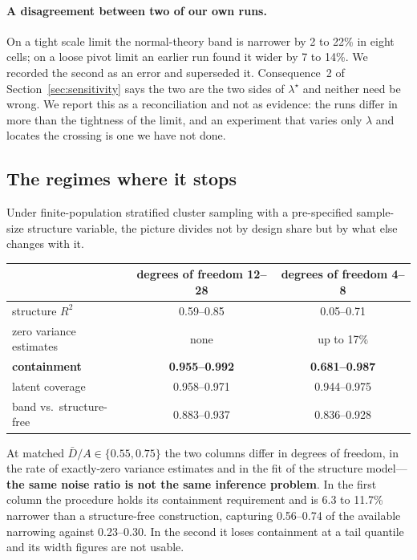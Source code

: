 \paragraph{A disagreement between two of our own runs.} On a tight scale limit
the normal-theory band is narrower by 2 to 22\% in eight cells; on a loose pivot
limit an earlier run found it wider by 7 to 14\%. We recorded the second as an
error and superseded it. Consequence~2 of Section~\ref{sec:sensitivity} says the
two are the two sides of $\lambda^\star$ and neither need be wrong. We report
this as a reconciliation and not as evidence: the runs differ in more than the
tightness of the limit, and an experiment that varies only $\lambda$ and locates
the crossing is one we have not done.

\subsection{The regimes where it stops}

Under finite-population stratified cluster sampling with a pre-specified
sample-size structure variable, the picture divides not by design share but by
what else changes with it.

\begin{center}
\begin{singlespace}
\small
\begin{tabular}{lcc}
\toprule
& degrees of freedom 12--28 & degrees of freedom 4--8\\
\midrule
structure $R^2$ & 0.59--0.85 & 0.05--0.71\\
zero variance estimates & none & up to 17\%\\
\textbf{containment} & \textbf{0.955--0.992} & \textbf{0.681--0.987}\\
latent coverage & 0.958--0.971 & 0.944--0.975\\
band vs.\ structure-free & 0.883--0.937 & 0.836--0.928\\
\bottomrule
\end{tabular}
\end{singlespace}
\end{center}

At matched $\bar D/A\in\{0.55,0.75\}$ the two columns differ in degrees of
freedom, in the rate of exactly-zero variance estimates and in the fit of the
structure model---\textbf{the same noise ratio is not the same inference
problem}. In the first column the procedure holds its containment requirement and
is 6.3 to 11.7\% narrower than a structure-free construction, capturing 0.56--0.74
of the available narrowing against 0.23--0.30. In the second it loses containment
at a tail quantile and its width figures are not usable.

